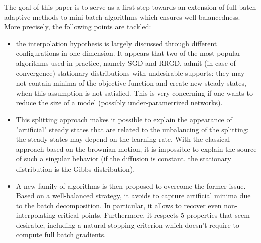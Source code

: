 \documentclass[article,authoryear,jmlmc]{beg_32}             %
\begin{document}
The goal of this paper is to serve as a first step towards an extension of full-batch adaptive methods \cite{Bilel} to mini-batch algorithms which ensures well-balancedness.
More precisely, the following points are tackled:
\begin{itemize}
	\item the interpolation hypothesis is largely discussed through different configurations in one dimension. It appears that two of the most popular algorithms used in practice, namely SGD and RRGD, admit (in case of convergence) stationary distributions with undesirable supports: they may not contain minima of the objective function and create new steady states, when this assumption is not satisfied. This is very concerning if one wants to reduce the size of a model (possibly under-parametrized networks).
	\item 
          This
          splitting approach makes it possible to explain the appearance of "artificial" steady states that are related to the unbalancing of the splitting: the steady states may depend on the learning rate. With the classical approach based on the brownian motion, it is impossible to explain the source of such a singular behavior (if the diffusion is constant, the stationary distribution is the Gibbs distribution).
         \item A new family of algorithms is then proposed to overcome the former issue. Based on a well-balanced strategy, it avoids to capture artificial minima due to the batch
           decomposition. In particular, it allows to recover even non-interpolating critical points. Furthermore, it respects 5 properties that seem desirable, including a natural stopping
           criterion which doesn't require to compute full batch gradients. 
\end{itemize}
\end{document}
